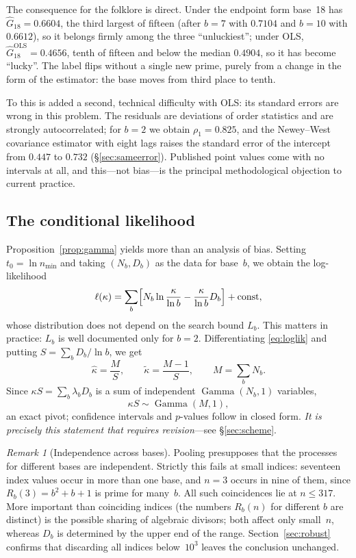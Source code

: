 \documentclass[11pt,a4paper]{article}
\theoremstyle{plain}
\theoremstyle{remark}
\newtheorem{remark}{Remark}
\newcommand{\Rb}{R_b}
\DeclareMathOperator{\Gam}{Gamma}
\begin{document}
The consequence for the folklore is direct. Under the endpoint form base~18 has
$\hat G_{18}=0.6604$, the third largest of fifteen (after $b=7$ with $0.7104$
and $b=10$ with $0.6612$), so it belongs firmly among the three ``unluckiest'';
under OLS, $\hat G_{18}^{\mathrm{OLS}}=0.4656$, tenth of fifteen and below the
median $0.4904$, so it has become ``lucky''. The label flips without a single
new prime, purely from a change in the form of the estimator: the base moves
from third place to tenth.

To this is added a second, technical difficulty with OLS: its standard errors
are wrong in this problem. The residuals are deviations of order statistics and
are strongly autocorrelated; for $b=2$ we obtain $\rho_1=0.825$, and the
Newey--West covariance estimator with eight lags raises the standard error of
the intercept from $0.447$ to $0.732$ (\S\ref{sec:sameerror}). Published point
values come with no intervals at all, and this---not bias---is the principal
methodological objection to current practice.

\subsection{The conditional likelihood}\label{sec:condlik}

Proposition~\ref{prop:gamma} yields more than an analysis of bias. Setting
$t_0=\ln n_{\min}$ and taking $(N_b,D_b)$ as the data for base~$b$, we obtain
the log-likelihood
\begin{equation}\label{eq:loglik}
\ell(\kappa)=\sum_b\Bigl[N_b\ln\frac{\kappa}{\ln b}-\frac{\kappa}{\ln b}D_b\Bigr]+\mathrm{const},
\end{equation}
whose distribution does not depend on the search bound $L_b$. This matters in
practice: $L_b$ is well documented only for $b=2$. Differentiating
\eqref{eq:loglik} and putting $S=\sum_b D_b/\ln b$, we get
\begin{equation}\label{eq:mle}
\hat\kappa=\frac{M}{S},\qquad \tilde\kappa=\frac{M-1}{S},\qquad M=\sum_b N_b .
\end{equation}
Since $\kappa S=\sum_b\lambda_bD_b$ is a sum of independent $\Gam(N_b,1)$
variables,
\begin{equation}\label{eq:pivot}
\kappa S\sim\Gam(M,1),
\end{equation}
an exact pivot; confidence intervals and $p$-values follow in closed form.
\emph{It is precisely this statement that requires revision}---see
\S\ref{sec:scheme}.

\begin{remark}[Independence across bases]
Pooling presupposes that the processes for different bases are independent.
Strictly this fails at small indices: seventeen index values occur in more than
one base, and $n=3$ occurs in nine of them, since $\Rb(3)=b^2+b+1$ is prime for
many~$b$. All such coincidences lie at $n\le317$. More important than coinciding
indices (the numbers $\Rb(n)$ for different $b$ are distinct) is the possible
sharing of algebraic divisors; both affect only small~$n$, whereas $D_b$ is
determined by the upper end of the range. Section~\ref{sec:robust} confirms that
discarding all indices below~$10^3$ leaves the conclusion unchanged.
\end{remark}
\end{document}
